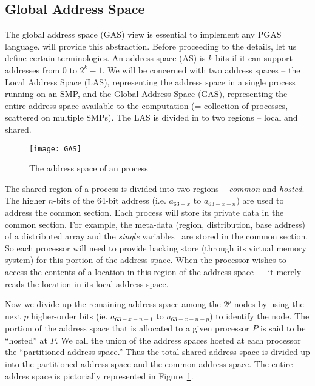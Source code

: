 \subsection {Global Address Space}
\label{sec:gas}

The global address space (GAS) view is essential to implement any PGAS
language. \Xtenlib{} will provide this abstraction.  Before proceeding
to the details, let us define certain terminologies.  An address space
(AS) is $k$-bits if it can support addresses from $0$ to $2^k-1$. We
will be concerned with two address spaces -- the Local Address Space
(LAS), representing the address space in a single process running on
an SMP, and the Global Address Space (GAS), representing the entire
address space available to the computation (= collection of processes,
scattered on multiple SMPs). The LAS is divided in to two regions --
local and shared.


\begin{figure}
\center
\texttt{[image: GAS]}
\caption{\Xten{} The address space of an \Xtenlib{} process}
\label{fig:as_layout}
\end{figure}

The shared region of a process is divided into two regions -- {\em common} and
{\em hosted}. The higher $n$-bits of the 64-bit address (i.e. $a_{63-x}$
to $a_{63-x-n}$) are used to address the common section. Each process
will store its private data in the common section. For example, the
meta-data (region, distribution, base address) of a distributed array
and the {\em single} variables~\cite{yelick98titanium} are stored in the common
section.  So each processor will need to provide backing store
(through its virtual memory system) for this portion of the address
space. When the processor wishes to access the contents of a location
in this region of the address space --- it merely reads the location in
its local address space.

Now we divide up the remaining address space among the $2^p$ nodes by 
using the next $p$ higher-order bits (ie. $a_{63-x-n-1}$ to $a_{63-x-n-p}$)
to identify the node. The portion of the 
address space that is allocated to a given processor $P$ is said to be 
``hosted'' at $P$. We call the union of the address spaces hosted at each 
processor the ``partitioned address space.'' Thus the total shared 
address space is divided up into the partitioned address space and the 
common address space. The entire addres space is pictorially represented
in Figure~\ref{fig:as_layout}. 

